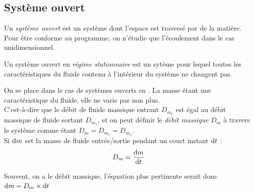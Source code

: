 \documentclass[11pt,a4paper,fleqn,pdftex]{report}
\begin{document}
\subsection{Système ouvert} %
\label{sub:systeme_ouvert}
\begin{dfn}
   Un \emph{système ouvert} est un système dont l'espace est traversé par de la matière. \\
   Pour être conforme au programme, on n'étudie que l'écoulement dans le cas unidimensionnel.
\end{dfn}
\begin{dfn}
   Un système ouvert en \emph{régime stationnaire} est un sytème pour lequel toutes les caractéristiques du fluide contenu à l'intérieur du système ne changent pas.
\end{dfn}
\begin{dfn}
   On se place dans le cas de systèmes ouverts en . La masse étant une caractéristique du fluide, elle ne varie pas non plus. \\
   C'est-à-dire que le débit de fluide massique entrant $D_{m_e}$ est égal au débit massique de fluide sortant $D_{m_s}$, et on peut définir le \emph{débit massique} $D_m$ à travers le système comme étant $D_m =D_{m_e} = D_{m_s}$.\\
   Si $\mathrm{d} m$ est la masse de fluide entrée/sortie pendant un court instant $\mathrm{d} t$ : 
   \begin{equation}
   D_m = \dfrac{\mathrm{d} m}{\mathrm{d} t}
   \end{equation}
\end{dfn}
Souvent, on a le débit massique, l'équation plus pertinente serait donc $\mathrm{d} m = D_m\times \mathrm{d} t$
\end{document}
